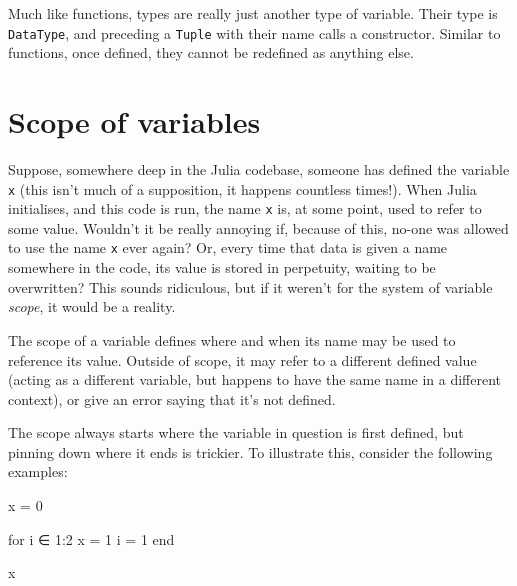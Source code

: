 \documentclass[
  letterpaper,
  DIV=11,
  numbers=noendperiod]{scrreprt}
\newenvironment{Shaded}{\begin{snugshade}}{\end{snugshade}}
\newcommand{\ControlFlowTok}[1]{\textcolor[rgb]{0.00,0.23,0.31}{#1}}
\newcommand{\FloatTok}[1]{\textcolor[rgb]{0.68,0.00,0.00}{#1}}
\newcommand{\NormalTok}[1]{\textcolor[rgb]{0.00,0.23,0.31}{#1}}
\newcommand{\OperatorTok}[1]{\textcolor[rgb]{0.37,0.37,0.37}{#1}}
\begin{document}
\begin{tcolorbox}[enhanced jigsaw, toprule=.15mm, opacitybacktitle=0.6, leftrule=.75mm, breakable, coltitle=black, bottomrule=.15mm, colbacktitle=quarto-callout-note-color!10!white, bottomtitle=1mm, rightrule=.15mm, title=\textcolor{quarto-callout-note-color}{\faInfo}\hspace{0.5em}{Note}, colframe=quarto-callout-note-color-frame, left=2mm, colback=white, opacityback=0, arc=.35mm, toptitle=1mm, titlerule=0mm]

Much like functions, types are really just another type of variable.
Their type is \texttt{DataType}, and preceding a \texttt{Tuple} with
their name calls a constructor. Similar to functions, once defined, they
cannot be redefined as anything else.

\end{tcolorbox}

\hypertarget{scope-of-variables}{%
\section{Scope of variables}\label{scope-of-variables}}

Suppose, somewhere deep in the Julia codebase, someone has defined the
variable \texttt{x} (this isn't much of a supposition, it happens
countless times!). When Julia initialises, and this code is run, the
name \texttt{x} is, at some point, used to refer to some value. Wouldn't
it be really annoying if, because of this, no-one was allowed to use the
name \texttt{x} ever again? Or, every time that data is given a name
somewhere in the code, its value is stored in perpetuity, waiting to be
overwritten? This sounds ridiculous, but if it weren't for the system of
variable \emph{scope}, it would be a reality.

The scope of a variable defines where and when its name may be used to
reference its value. Outside of scope, it may refer to a different
defined value (acting as a different variable, but happens to have the
same name in a different context), or give an error saying that it's not
defined.

The scope always starts where the variable in question is first defined,
but pinning down where it ends is trickier. To illustrate this, consider
the following examples:

\begin{Shaded}
\begin{Highlighting}[]
\NormalTok{x }\OperatorTok{=} \FloatTok{0}

\ControlFlowTok{for}\NormalTok{ i }\OperatorTok{∈} \FloatTok{1}\OperatorTok{:}\FloatTok{2}
\NormalTok{    x }\OperatorTok{=} \FloatTok{1}
\NormalTok{    i }\OperatorTok{=} \FloatTok{1}
\ControlFlowTok{end}

\NormalTok{x}
\end{Highlighting}
\end{Shaded}
\end{document}
